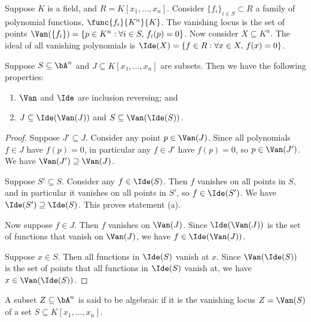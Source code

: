 \begin{definition}
    Suppose \(K\) is a field, and \(R = K[x_1,\hdots,x_n]\).
    Consider \({\{f_i\}}_{i \in S} \subset R\) a family of polynomial functions,
    \(\func{f_i}{K^n}{K}\).
    The vanishing locus is the set of points
    \(\Van(\{f_i\}) = \{p \in K^n: \forall i \in S,\,f_i(p) = 0\}\).
    Now consider \(X \subseteq K^n\).
    The ideal of all vanishing polynomials is
    \(\Ide(X) = \{f \in R: \forall x \in X,\,f(x) = 0\}\).
\end{definition}
\begin{lemma}\label{lem:iv-inclusion-reversing}
    Suppose \(S \subseteq \bA^n\) and \(J \subseteq K[x_1,\hdots,x_n]\) are subsets.
    Then we have the following properties:
    \begin{enumerate}[label={(\alph*)}, itemsep=0mm]
        \item \(\Van\) and \(\Ide\) are inclusion reversing; and
        \item \(J \subseteq \Ide(\Van(J))\) and \(S \subseteq \Van(\Ide(S))\).
    \end{enumerate}
\end{lemma}
\begin{proof}
    Suppose \(J' \subseteq J\).
    Consider any point \(p \in \Van(J)\).
    Since all polynomials \(f \in J\) have \(f(p) = 0\),
    in particular any \(f \in J'\) have \(f(p) = 0\),
    so \(p \in \Van(J')\).
    We have \(\Van(J') \supseteq \Van(J)\).

    Suppose \(S' \subseteq S\).
    Consider any \(f \in \Ide(S)\).
    Then \(f\) vanishes on all points in \(S\),
    and in particular it vanishes on all points in \(S'\),
    so \(f \in \Ide(S')\).
    We have \(\Ide(S') \supseteq \Ide(S)\).
    This proves statement (a).

    \medskip

    Now suppose \(f \in J\).
    Then \(f\) vanishes on \(\Van(J)\).
    Since \(\Ide(\Van(J))\) is the set of functions that vanish on \(\Van(J)\),
    we have \(f \in \Ide(\Van(J))\).

    Suppose \(x \in S\).
    Then all functions in \(\Ide(S)\) vanish at \(x\).
    Since \(\Van(\Ide(S))\) is the set of points that all functions in \(\Ide(S)\) vanish at,
    we have \(x \in \Van(\Ide(S))\).
\end{proof}
\begin{definition}
    A subset \(Z \subseteq \bA^n\) is said to be algebraic
    if it is the vanishing locus \(Z = \Van(S)\)
    of a set \(S \subseteq K[x_1,\hdots,x_n]\).
\end{definition}
